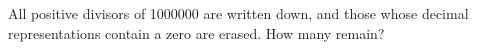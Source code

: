 All positive divisors of 1000000 are written down, and those whose decimal representations contain a zero are erased. How many remain?
